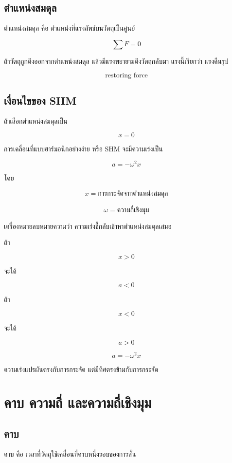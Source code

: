 \subsection{ตำแหน่งสมดุล}

ตำแหน่งสมดุล คือ ตำแหน่งที่แรงลัพธ์บนวัตถุเป็นศูนย์

\[
\sum F=0
\]

ถ้าวัตถุถูกดึงออกจากตำแหน่งสมดุล แล้วมีแรงพยายามดึงวัตถุกลับมา แรงนี้เรียกว่า แรงคืนรูป

\[
\text{restoring force}
\]

\subsection{เงื่อนไขของ SHM}

ถ้าเลือกตำแหน่งสมดุลเป็น

\[
x=0
\]

การเคลื่อนที่แบบฮาร์มอนิกอย่างง่าย หรือ SHM จะมีความเร่งเป็น

\[
a=-\omega^2x
\]

โดย

\[
x=\text{การกระจัดจากตำแหน่งสมดุล}
\]

\[
\omega=\text{ความถี่เชิงมุม}
\]

เครื่องหมายลบหมายความว่า ความเร่งชี้กลับเข้าหาตำแหน่งสมดุลเสมอ

ถ้า

\[
x>0
\]

จะได้

\[
a<0
\]

ถ้า

\[
x<0
\]

จะได้

\[
a>0
\]

\begin{tcolorbox}[title=เงื่อนไขของ SHM]
\[
a=-\omega^2x
\]

ความเร่งแปรผันตรงกับการกระจัด แต่มีทิศตรงข้ามกับการกระจัด
\end{tcolorbox}

\section{คาบ ความถี่ และความถี่เชิงมุม}

\subsection{คาบ}

คาบ คือ เวลาที่วัตถุใช้เคลื่อนที่ครบหนึ่งรอบของการสั่น

